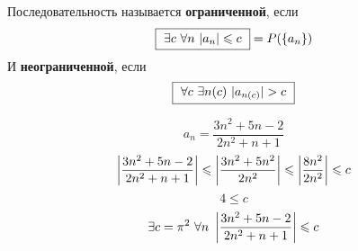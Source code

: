 \begin{definition}
    Последовательность называется \textbf{ограниченной}, если
    $$ \fbox{
        $ \exists c\ \forall n\ |a_n| \leq c $
    } = P(\{a_n\}) $$
    И \textbf{неограниченной}, если
    $$ \fbox{
        $ \forall c\ \exists n(c)\ |a_{n(c)}| > c $
    } $$
\end{definition}

\begin{example}
    $$ a_n = \frac{3n^2 + 5n - 2}{2n^2 + n + 1} $$
    $$ \l|\frac{3n^2 + 5n - 2}{2n^2 + n + 1}\r| \leq \l|\frac{3n^2 + 5n^2}{2n^2}\r| \leq \l|\frac{8n^2}{2n^2}\r| \leq c $$
    $$ 4 \leq c $$
    $$ \exists c = \pi^2\ \forall n\ \l|\frac{3n^2 + 5n - 2}{2n^2 + n + 1}\r| \leq c$$
\end{example}
